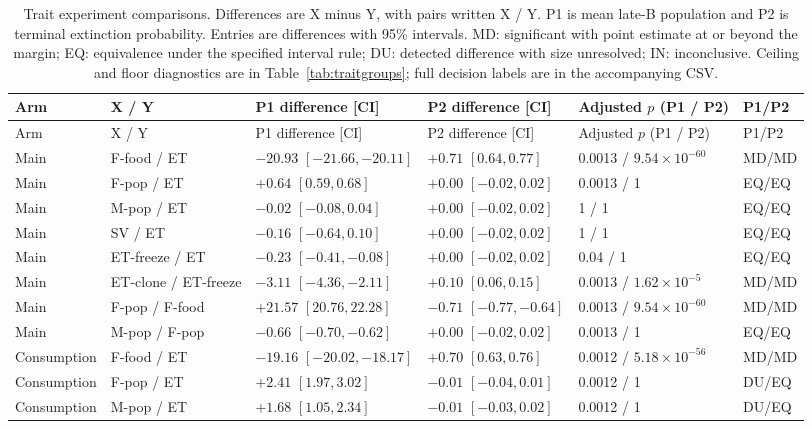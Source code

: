 {\small
\begin{longtable}{P{2.1cm}P{2.1cm}P{2.75cm}P{2.65cm}P{2.4cm}P{1.4cm}}
\caption{Trait experiment comparisons. Differences are X minus Y, with pairs written X / Y. P1 is mean late-B population and P2 is terminal extinction probability. Entries are differences with 95\% intervals. MD: significant with point estimate at or beyond the margin; EQ: equivalence under the specified interval rule; DU: detected difference with size unresolved; IN: inconclusive. Ceiling and floor diagnostics are in Table~\ref{tab:traitgroups}; full decision labels are in the accompanying CSV.}\label{tab:traitcontrasts}\\
\toprule
Arm & X / Y & P1 difference [CI] & P2 difference [CI] & Adjusted $p$ (P1 / P2) & P1/P2\\\midrule
\endfirsthead
\toprule
Arm & X / Y & P1 difference [CI] & P2 difference [CI] & Adjusted $p$ (P1 / P2) & P1/P2\\\midrule
\endhead
\bottomrule\endfoot
Main & F-food / ET & $-20.93$ $[-21.66,-20.11]$ & $+0.71$ $[0.64,0.77]$ & 0.0013 / $9.54\times10^{-60}$ & MD/MD\\
Main & F-pop / ET & $+0.64$ $[0.59,0.68]$ & $+0.00$ $[-0.02,0.02]$ & 0.0013 / 1 & EQ/EQ\\
Main & M-pop / ET & $-0.02$ $[-0.08,0.04]$ & $+0.00$ $[-0.02,0.02]$ & 1 / 1 & EQ/EQ\\
Main & SV / ET & $-0.16$ $[-0.64,0.10]$ & $+0.00$ $[-0.02,0.02]$ & 1 / 1 & EQ/EQ\\
Main & ET-freeze / ET & $-0.23$ $[-0.41,-0.08]$ & $+0.00$ $[-0.02,0.02]$ & 0.04 / 1 & EQ/EQ\\
Main & ET-clone / ET-freeze & $-3.11$ $[-4.36,-2.11]$ & $+0.10$ $[0.06,0.15]$ & 0.0013 / $1.62\times10^{-5}$ & MD/MD\\
Main & F-pop / F-food & $+21.57$ $[20.76,22.28]$ & $-0.71$ $[-0.77,-0.64]$ & 0.0013 / $9.54\times10^{-60}$ & MD/MD\\
Main & M-pop / F-pop & $-0.66$ $[-0.70,-0.62]$ & $+0.00$ $[-0.02,0.02]$ & 0.0013 / 1 & EQ/EQ\\
Consumption & F-food / ET & $-19.16$ $[-20.02,-18.17]$ & $+0.70$ $[0.63,0.76]$ & 0.0012 / $5.18\times10^{-56}$ & MD/MD\\
Consumption & F-pop / ET & $+2.41$ $[1.97,3.02]$ & $-0.01$ $[-0.04,0.01]$ & 0.0012 / 1 & DU/EQ\\
Consumption & M-pop / ET & $+1.68$ $[1.05,2.34]$ & $-0.01$ $[-0.03,0.02]$ & 0.0012 / 1 & DU/EQ\\

\end{longtable}}
